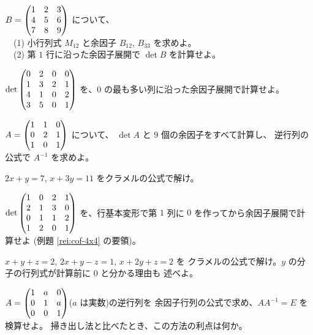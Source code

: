 \begin{mondai}[基本]\label{q:cof-ex1}
$B = \begin{pmatrix}1 & 2 & 3 \\ 4 & 5 & 6 \\ 7 & 8 & 9\end{pmatrix}$ について、\\
　(1) 小行列式 $M_{12}$ と余因子 $B_{12}$, $B_{33}$ を求めよ。\\
　(2) 第 $1$ 行に沿った余因子展開で $\det B$ を計算せよ。
\end{mondai}

\begin{mondai}[基本]\label{q:cof-ex2}
$\det \begin{pmatrix}0 & 2 & 0 & 0 \\ 1 & 3 & 2 & 1 \\ 4 & 1 & 0 & 2 \\ 3 & 5 & 0 & 1\end{pmatrix}$
を、$0$ の最も多い列に沿った余因子展開で計算せよ。
\end{mondai}

\begin{mondai}[基本]\label{q:cof-ex3}
$A = \begin{pmatrix}1 & 1 & 0 \\ 0 & 2 & 1 \\ 1 & 0 & 1\end{pmatrix}$ について、
$\det A$ と $9$ 個の余因子をすべて計算し、
逆行列の公式で $A^{-1}$ を求めよ。
\end{mondai}

\begin{mondai}[基本]\label{q:cof-ex4}
$2x + y = 7$, $x + 3y = 11$ をクラメルの公式で解け。
\end{mondai}

\begin{mondai}[標準]\label{q:cof-ex5}
$\det \begin{pmatrix}1 & 0 & 2 & 1 \\ 2 & 1 & 3 & 0 \\ 0 & 1 & 1 & 2 \\ 1 & 2 & 0 & 1\end{pmatrix}$
を、行基本変形で第 $1$ 列に $0$ を作ってから余因子展開で計算せよ
(例題 \ref{rei:cof-4x4} の要領)。
\end{mondai}

\begin{mondai}[標準]\label{q:cof-ex6}
$x + y + z = 2$, $2x + y - z = 1$, $x + 2y + z = 2$ を
クラメルの公式で解け。$y$ の分子の行列式が計算前に $0$ と分かる理由も
述べよ。
\end{mondai}

\begin{mondai}[標準]\label{q:cof-ex7}
$A = \begin{pmatrix}1 & a & 0 \\ 0 & 1 & a \\ 0 & 0 & 1\end{pmatrix}$($a$ は実数)の逆行列を
余因子行列の公式で求め、$A A^{-1} = E$ を検算せよ。
掃き出し法と比べたとき、この方法の利点は何か。
\end{mondai}

